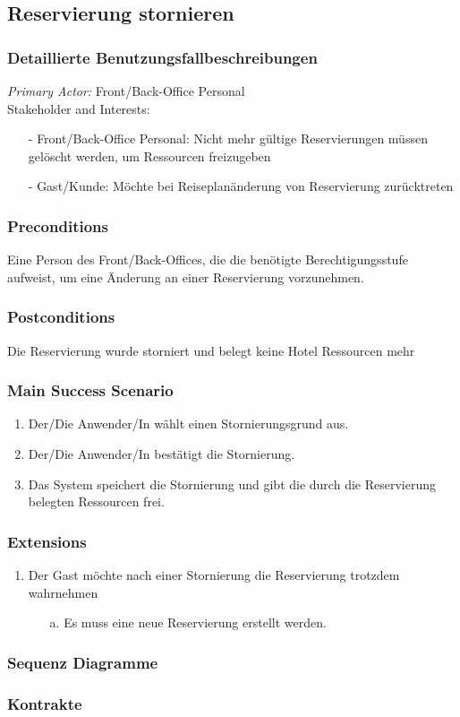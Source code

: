 \documentclass[./detailed_overview_usecases.tex]{subfiles}
\begin{document}
    \subsection{Reservierung stornieren}
    \subsubsection{Detaillierte Benutzungsfallbeschreibungen}
    \textit{Primary Actor:}
    Front/Back-Office Personal
    \\
    Stakeholder and Interests:
    \begin{itemize}
        \item[-] Front/Back-Office Personal: Nicht mehr gültige Reservierungen müssen gelöscht werden, um Ressourcen freizugeben
        \item[-] Gast/Kunde: Möchte bei Reiseplanänderung von Reservierung zurücktreten
    \end{itemize}

    \subsubsection*{Preconditions}
    Eine Person des Front/Back-Offices, die die benötigte Berechtigungsstufe aufweist, um eine Änderung an einer Reservierung vorzunehmen.

    \subsubsection*{Postconditions}
    Die Reservierung wurde storniert und belegt keine Hotel Ressourcen mehr

    \subsubsection*{Main Success Scenario}
    \begin{enumerate}
        \item Der/Die Anwender/In wählt einen Stornierungsgrund aus.
        \item Der/Die Anwender/In bestätigt die Stornierung.
        \item Das System speichert die Stornierung und gibt die durch die Reservierung belegten Ressourcen frei.
    \end{enumerate}

    \subsubsection*{Extensions}
    \begin{enumerate}
        \item Der Gast möchte nach einer Stornierung die Reservierung trotzdem wahrnehmen
        \begin{itemize}
            \item[a.] Es muss eine neue Reservierung erstellt werden.
        \end{itemize}
    \end{enumerate}

    \subsubsection{Sequenz Diagramme}
    \subsubsection{Kontrakte}
\end{document}
